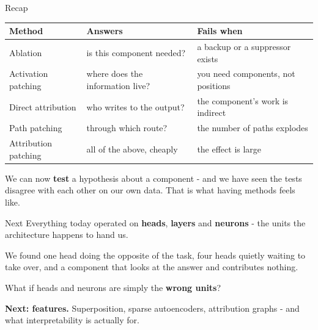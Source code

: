 \documentclass[aspectratio=169]{beamer}
\newcommand{\takebox}[1]{%
  \begin{tcolorbox}[colback=paramgreen!8, colframe=paramgreen, boxrule=0.6pt, arc=2pt]
  #1
  \end{tcolorbox}}
\begin{document}
\begin{frame}{Recap}
  \vspace{0.4em}
  \begin{center}
  \small
  \begin{tabular}{@{}p{}p{}p{}@{}}
    \toprule
    \textbf{Method} & \textbf{Answers} & \textbf{Fails when}\\
    \midrule
    Ablation & is this component needed? & a backup or a suppressor exists\\[0.4em]
    Activation patching & where does the information live? & you need components, not positions\\[0.4em]
    Direct attribution & who writes to the output? & the component's work is indirect\\[0.4em]
    Path patching & through which route? & the number of paths explodes\\[0.4em]
    Attribution patching & all of the above, cheaply & the effect is large\\
    \bottomrule
  \end{tabular}
  \end{center}

  \vspace{0.6em}
  \takebox{We can now \textbf{test} a hypothesis about a component - and we have seen the tests
  disagree with each other on our own data. That is what having methods feels like.}
\end{frame}

\begin{frame}{Next}
  \vspace{0.9em}
  Everything today operated on \textbf{heads}, \textbf{layers} and \textbf{neurons} - the units
  the architecture happens to hand us.

  \vspace{0.8em}
  We found one head doing the opposite of the task, four heads quietly waiting to take over, and
  a component that looks at the answer and contributes nothing.

  \vspace{1.1em}
  \begin{center}
    {\large What if heads and neurons are simply the \textbf{wrong units}?}
  \end{center}

  \vspace{1.1em}
  \takebox{\textbf{Next: features.} Superposition, sparse autoencoders, attribution graphs - and
  what interpretability is actually for.}
\end{frame}
\end{document}
